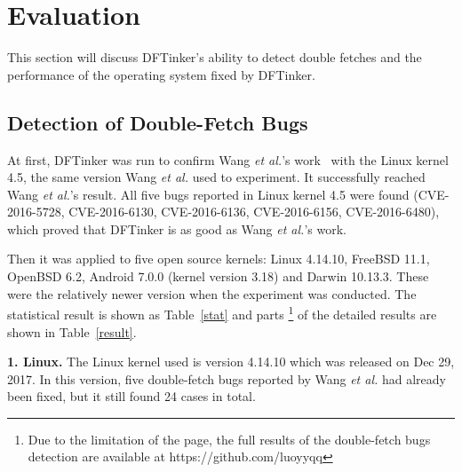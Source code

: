 \documentclass[10pt]{llncs}
\begin{document}
\section{Evaluation}%
\label{evalue}
This section will discuss DFTinker's ability to detect double fetches and the performance of the operating system fixed by DFTinker.
\subsection{Detection of Double-Fetch Bugs}
\label{evalue1}


At first, DFTinker was run to confirm Wang \textit{et al.}'s work~\cite{wang} with the Linux kernel 4.5, the same version Wang \textit{et al.} used to experiment. It successfully reached Wang \textit{et al.}'s result. All five bugs reported in Linux kernel 4.5 were found (CVE-2016-5728, CVE-2016-6130, CVE-2016-6136, CVE-2016-6156, CVE-2016-6480), which proved that DFTinker is as good as Wang \textit{et al.}'s work.


Then it was applied to five open source kernels: Linux 4.14.10, FreeBSD 11.1, OpenBSD 6.2, Android 7.0.0 (kernel version 3.18) and Darwin 10.13.3. These were the relatively newer version when the experiment was conducted. The statistical result is shown as Table~\ref{stat} and parts
\footnote{Due to the limitation of the page, the full results of the double-fetch bugs detection are available at https://github.com/luoyyqq}​ of the detailed results are shown in Table~\ref{result}.

\textbf{1. Linux.} The Linux kernel used is version 4.14.10 which was released on Dec 29, 2017. In this version, five double-fetch bugs reported by Wang \textit{et al.} had already been fixed, but it still found 24 cases in total.
\end{document}
